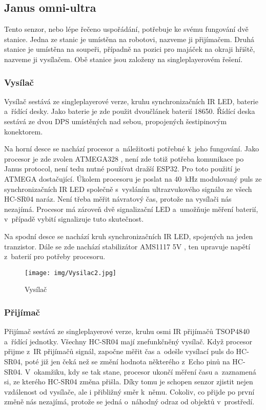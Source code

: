 \subsection{Janus omni-ultra}
Tento senzor, nebo lépe řečeno uspořádání, potřebuje ke svému fungování dvě stanice.
Jedna ze stanic je umístěna na robotovi, nazveme ji přijímačem.
Druhá stanice je umístěna na soupeři, případně na pozici pro majáček na okraji hřiště, nazveme ji vysílačem.
Obě stanice jsou založeny na singleplayerovém řešení.

\subsubsection{Vysílač}
Vysílač sestává ze singleplayerové verze, kruhu synchronizačních IR LED, baterie a~řídící desky.
Jako baterie je zde použit dvoučlánek baterií 18650.
Řídící deska sestává ze dvou DPS umístěných nad sebou, propojených šestipinovým konektorem.

Na horní desce se nachází procesor a~náležitosti potřebné k~jeho fungování.
Jako procesor je zde zvolen ATMEGA328 \cite{atmega}, není zde totiž potřeba komunikace po Janus protocol, není tedu nutné používat dražší ESP32.
Pro toto použití je ATMEGA dostačující.
Úkolem procesoru je poslat na 40~kHz modulovaný puls ze synchronizačních IR LED společně s~vysláním ultrazvukového signálu ze všech HC-SR04 naráz. 
Není třeba měřit návratový čas, protože na vysílači nás nezajímá.
Procesor má zároveň dvě signalizační LED a~umožňuje měření baterií, v~případě vybití signalizuje tuto skutečnost.

Na spodní desce se nachází kruh synchronizačních IR LED, spojených na jeden tranzistor.
Dále se zde nachází stabilizátor AMS1117 5V \cite{ams1117}, ten upravuje napětí z~baterií pro potřeby procesoru.

\begin{figure}
    \begin{small}
        \begin{center}
            \texttt{[image: img/Vysilac2.jpg]}
        \end{center}
        \caption{Vysílač}
        \label{fig: Ultrasonic}
    \end{small}
\end{figure}


\subsubsection{Přijímač}
Přijímač sestává ze singleplayerové verze, kruhu osmi IR přijímačů TSOP4840 a~řídící jednotky.
Všechny HC-SR04 mají znefunkčněný vysílač.
Když procesor přijme z~IR přijímačů signál, započne měřit čas a~odešle vysílací puls do HC-SR04, poté již jen čeká než se změní hodnota některého z~Echo pinů na HC-SR04.
V~okamžiku, kdy se tak stane, procesor ukončí měření času a~zaznamená si, ze kterého HC-SR04 změna přišla.
Díky tomu je schopen senzor zjistit nejen vzdálenost od vysílače, ale i přibližný směr k~němu.
Cokoliv, co přijde po první změně nás nezajímá, protože se jedná o~náhodný odraz od objektů v~prostředí.

